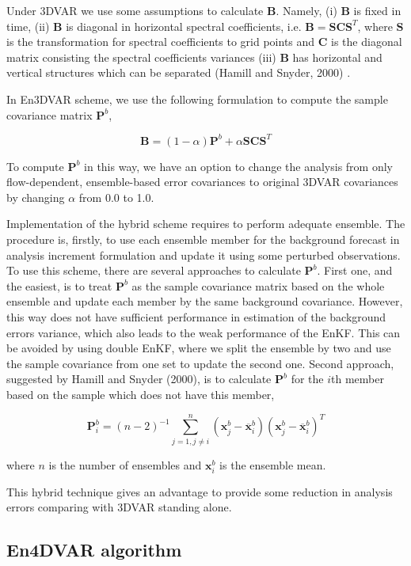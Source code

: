 \documentclass[a4,12pt]{article}
\numberwithin{equation}{section}
\begin{document}
Under 3DVAR we use some assumptions to calculate $\textbf{B}$. Namely, (i) $\textbf{B}$ is fixed in time, (ii) $\textbf{B}$ is diagonal in horizontal spectral coefficients, i.e. $\textbf{B} = \textbf{S}\textbf{C}\textbf{S}^{T}$, where $\textbf{S}$ is the transformation for spectral coefficients to grid points and $\textbf{C}$ is the diagonal matrix consisting the spectral coefficients variances (iii) $\textbf{B}$ has horizontal and vertical structures which can be separated (Hamill and Snyder, 2000) \cite{En3DVAR}.

In En3DVAR scheme, we use the following formulation to compute the sample covariance matrix $\textbf{P}^{b}$,

$$\textbf{B} = (1 - \alpha)\textbf{P}^{b} + \alpha \textbf{S}\textbf{C}\textbf{S}^{T}$$

To compute $\textbf{P}^{b}$ in this way, we have an option to change the analysis from only flow-dependent, ensemble-based error covariances to original 3DVAR covariances by changing $\alpha$ from 0.0 to 1.0.

Implementation of the hybrid scheme requires to perform adequate ensemble. The procedure is, firstly, to use each ensemble member for the background forecast in analysis increment formulation and update it using some perturbed observations. To use this scheme, there are several approaches to calculate $\textbf{P}^{b}$. First one, and the easiest, is to treat $\textbf{P}^{b}$ as the sample covariance matrix based on the whole ensemble and update each member by the same background covariance. However, this way does not have sufficient performance in estimation of the background errors variance, which also leads to the weak performance of the EnKF. This can be avoided by using double EnKF, where we split the ensemble by two and use the sample covariance from one set to update the second one. Second approach, suggested by Hamill and Snyder (2000), is to calculate $\textbf{P}^{b}$ for the $i$th member based on the sample which does not have this member, 

$$\textbf{P}^{b}_{i} = (n-2)^{-1} \sum_{j=1, j \ne i}^{n}(\textbf{x}_{j}^{b} - \overline{\textbf{x}}_{i}^{b})(\textbf{x}_{j}^{b} - \overline{\textbf{x}}_{i}^{b})^{T}$$

where $n$ is the number of ensembles and  $\textbf{x}_{i}^{b}$ is the ensemble mean.

This hybrid technique gives an advantage to provide some reduction in analysis errors comparing with 3DVAR standing alone.

\subsection{En4DVAR algorithm}
\end{document}
